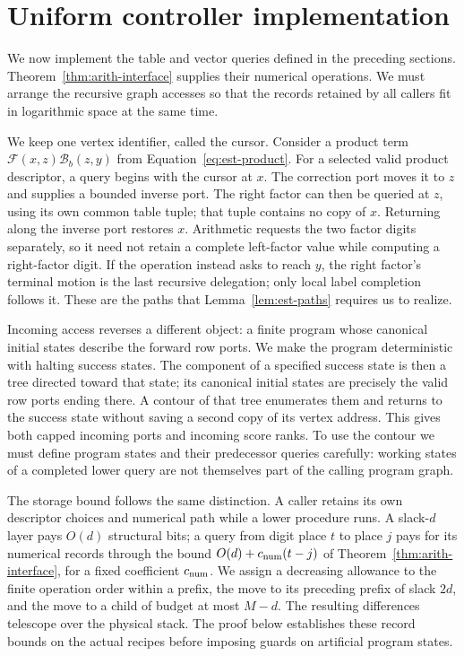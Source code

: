 \section{Uniform controller implementation}\label{sec:ctrl}

We now implement the table and vector queries defined in the preceding
sections.  Theorem~\ref{thm:arith-interface} supplies their numerical
operations.  We must arrange the recursive graph accesses so that the
records retained by all callers fit in logarithmic space at the same
time.

We keep one vertex identifier, called the cursor.  Consider a product term
$\mathcal F(x,z)\mathcal B_b(z,y)$ from
Equation~\eqref{eq:est-product}.  For a selected valid product descriptor, a query begins with the cursor
at $x$.
The correction port moves it to $z$ and supplies a bounded inverse port.
The right factor can then be queried at $z$, using its own common table
tuple; that tuple contains no copy of $x$.  Returning along the inverse
port restores $x$.  Arithmetic requests the two factor digits separately,
so it need not retain a complete left-factor value while computing a
right-factor digit.  If the operation instead asks to reach $y$, the
right factor's terminal motion is the last recursive delegation; only
local label completion follows it.  These are the paths that
Lemma~\ref{lem:est-paths} requires us to realize.

Incoming access reverses a different object: a finite program whose
canonical initial states describe the forward row ports.  We make the
program deterministic with halting success states.  The component of a
specified success state is then a tree directed toward that state; its
canonical initial states are precisely the valid row ports ending there.  A contour of that tree enumerates them and returns to
the success state without saving a second copy of its vertex address.  This gives both
capped incoming ports and incoming score ranks.  To use the contour we
must define program states and their predecessor queries carefully:
working states of a completed lower query are not themselves part of
the calling program graph.

The storage bound follows the same distinction.  A caller retains its
own descriptor choices and numerical path while a lower procedure runs.
A slack-$d$ layer pays $O(d)$ structural bits; a query from digit place
$t$ to place $j$ pays for its numerical records through the bound
$O(d)+c_{\rm num}(t-j)$ of Theorem~\ref{thm:arith-interface}, for a
fixed coefficient $c_{\rm num}$.  We assign a decreasing
allowance to the finite operation order within a prefix, the move to its
preceding prefix of slack $2d$, and the move to a child of budget at most
$M-d$.  The resulting differences telescope over the physical stack.
The proof below establishes these record bounds on the actual recipes
before imposing guards on artificial program states.

